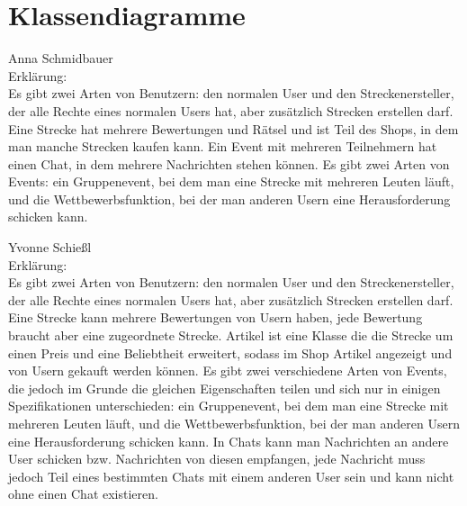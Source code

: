 \documentclass[a4paper, 12pp]{article}
\begin{document}
\section{Klassendiagramme}


\begin{figure}[H] 
\centering
	\fbox{\begin{minipage}{16cm} 
	\end{minipage}}
\end{figure}
Anna Schmidbauer\\
Erklärung:\\
Es gibt zwei Arten von Benutzern: den normalen User und den Streckenersteller, der alle Rechte eines normalen Users hat, aber zusätzlich Strecken erstellen darf. Eine Strecke hat mehrere Bewertungen und Rätsel und ist Teil des Shops, in dem man manche Strecken kaufen kann. Ein Event mit mehreren Teilnehmern hat einen Chat, in dem mehrere Nachrichten stehen können. Es gibt zwei Arten von Events: ein Gruppenevent, bei dem man eine Strecke mit mehreren Leuten läuft, und die Wettbewerbsfunktion, bei der man anderen Usern eine Herausforderung schicken kann.\\

\begin{figure}[H] 
\centering
	\fbox{\begin{minipage}{16cm} 
	\end{minipage}}
\end{figure}
Yvonne Schießl\\
Erklärung:\\
Es gibt zwei Arten von Benutzern: den normalen User und den Streckenersteller, der alle Rechte eines normalen Users hat, aber zusätzlich Strecken erstellen darf. Eine Strecke kann mehrere Bewertungen von Usern haben, jede Bewertung braucht aber eine zugeordnete Strecke. Artikel ist eine Klasse die die Strecke um einen Preis und eine Beliebtheit erweitert, sodass im Shop Artikel angezeigt und von Usern gekauft werden können. Es gibt zwei verschiedene Arten von Events, die jedoch im Grunde die gleichen Eigenschaften teilen und sich nur in einigen Spezifikationen unterschieden: ein Gruppenevent, bei dem man eine Strecke mit mehreren Leuten läuft, und die Wettbewerbsfunktion, bei der man anderen Usern eine Herausforderung schicken kann. In Chats kann man Nachrichten an andere User schicken bzw. Nachrichten von diesen empfangen, jede Nachricht muss jedoch Teil eines bestimmten Chats mit einem anderen User sein und kann nicht ohne einen Chat existieren.\\
\end{document}
